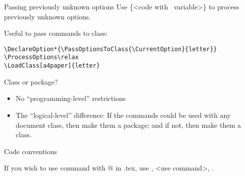 \begin{frame}[fragile]{Passing previously unknown options}\relax
     Use \ccol\DeclareOption*\{<code with \ccol\CurrentOption\ variable>\} to process previously unknown options.
     
     Useful to pass commands to class:
     
     \begin{lstlisting}
\DeclareOption*{\PassOptionsToClass{\CurrentOption}{letter}}
\ProcessOptions\relax
\LoadClass[a4paper]{letter}
    \end{lstlisting}
\end{frame}

\begin{frame}{Class or package?}\relax
     \begin{itemize}
         \item No ``programming-level'' restrictions
         \item The ``logical-level'' difference: If the commands could be used with any document class, then make them a package; and if not, then make them a class.
          
     \end{itemize}
     
\end{frame}

\begin{frame}[fragile]{Code conventions}\relax
     
     If you wish to use command with @ in .tex, use \ccol\makeatletter, <use command>, \ccol\makeatother.
\end{frame}